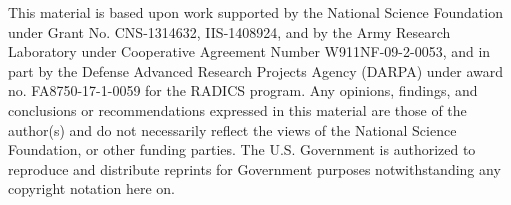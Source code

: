 \documentclass[runningheads]{llncs}
\begin{document}
This material is based upon work supported by the National Science Foundation under Grant No. CNS-1314632, IIS-1408924, and by the Army Research Laboratory under Cooperative Agreement Number W911NF-09-2-0053, and in part by the Defense Advanced Research Projects Agency (DARPA) under award no. FA8750-17-1-0059 for the RADICS program. Any opinions, findings, and conclusions or recommendations expressed in this material are those of the author(s) and do not necessarily reflect the views of the National Science Foundation, or other funding parties. The U.S. Government is authorized to reproduce and distribute reprints for Government purposes notwithstanding any copyright notation here on.



\end{document}
